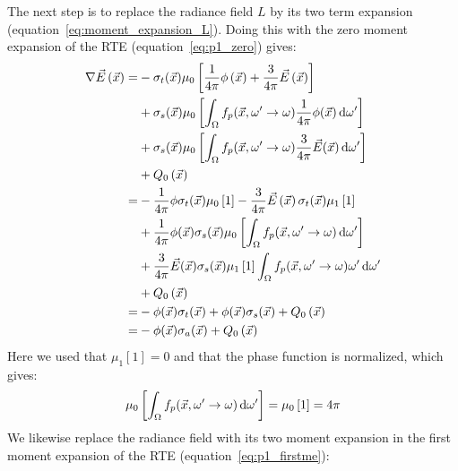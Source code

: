 The next step is to replace the radiance field $L$ by its two term expansion (equation~\ref{eq:moment_expansion_L}). Doing this with the zero moment expansion of the RTE (equation~\ref{eq:p1_zero}) gives:
\begin{align*}
\nabla\vec{E}\left(\vec{x}\right)=
&
-\sigma_t(\vec{x})\mu_0\left[\frac{1}{4\pi}\phi\left(\vec{x}\right) + \frac{3}{4\pi}\vec{E}\left(\vec{x}\right)\right]
\\
&
+\sigma_s(\vec{x})\mu_0\left[\int_{\Omega}f_p(\vec{x}, \omega'\rightarrow\omega)\frac{1}{4\pi}\phi(\vec{x})\,\mathrm{d}\omega'\right]
\\
&
+\sigma_s(\vec{x})\mu_0\left[\int_{\Omega}f_p(\vec{x}, \omega'\rightarrow\omega)\frac{3}{4\pi}\vec{E}(\vec{x})\,\mathrm{d}\omega'\right]
\\
&
\nonumber
+ Q_0\left(\vec{x}\right)
\\
=&
-\frac{1}{4\pi}\phi\sigma_t(\vec{x})\mu_0\left[1\right] - \frac{3}{4\pi}\vec{E}\left(\vec{x}\right)\sigma_t(\vec{x})\mu_1\left[1\right]
\\
&
+\frac{1}{4\pi}\phi(\vec{x})\sigma_s(\vec{x})\mu_0\left[\int_{\Omega}f_p(\vec{x}, \omega'\rightarrow\omega)\,\mathrm{d}\omega'\right]
\\
&
+\frac{3}{4\pi}\vec{E}(\vec{x})\sigma_s(\vec{x})\mu_1\left[1\right]\int_{\Omega}f_p(\vec{x}, \omega'\rightarrow\omega)\omega'\,\mathrm{d}\omega'
\\
&
+ Q_0\left(\vec{x}\right)
\\
=&
-\phi(\vec{x})\sigma_t(\vec{x})
+\phi(\vec{x})\sigma_s(\vec{x})
+Q_0\left(\vec{x}\right)
\\
=&
-\phi(\vec{x})\sigma_a(\vec{x})
+Q_0\left(\vec{x}\right)
\end{align*}
Here we used that $\mu_1[1] = 0$ and that the phase function is normalized, which gives:
\begin{align*}
\mu_0\left[\int_{\Omega}f_p(\vec{x}, \omega'\rightarrow\omega)\,\mathrm{d}\omega'\right] = \mu_0\left[1\right] = 4\pi
\end{align*}
We likewise replace the radiance field with its two moment expansion in the first moment expansion of the RTE (equation~\ref{eq:p1_firstme}):
